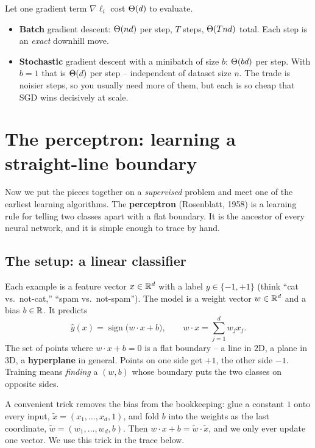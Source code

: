 \begin{complexitybox}
Let one gradient term $\nabla\ell_i$ cost $\Theta(d)$ to evaluate.
\begin{itemize}
  \item \textbf{Batch} gradient descent: $\Theta(nd)$ per step, $T$ steps,
        $\Theta(Tnd)$ total. Each step is an \emph{exact} downhill move.
  \item \textbf{Stochastic} gradient descent with a minibatch of size $b$:
        $\Theta(bd)$ per step. With $b=1$ that is $\Theta(d)$ per step -- independent
        of dataset size $n$. The trade is noisier steps, so you usually need
        more of them, but each is so cheap that SGD wins decisively at scale.
\end{itemize}
\end{complexitybox}

\section{The perceptron: learning a straight-line boundary}
\label{ch36:perceptron}

Now we put the pieces together on a \emph{supervised} problem and meet one of
the earliest learning algorithms. The \textbf{perceptron} (Rosenblatt, 1958) is
a learning rule for telling two classes apart with a flat boundary. It is the
ancestor of every neural network, and it is simple enough to trace by hand.

\subsection{The setup: a linear classifier}

Each example is a feature vector $x\in\mathbb{R}^d$ with a label $y\in\{-1,+1\}$ (think
``cat vs.\ not-cat,'' ``spam vs.\ not-spam''). The model is a weight vector
$w\in\mathbb{R}^d$ and a bias $b\in\mathbb{R}$. It predicts
\[
  \hat{y}(x) = \operatorname{sign}\big(w\cdot x + b\big),
  \qquad w\cdot x = \sum_{j=1}^{d} w_j x_j .
\]
The set of points where $w\cdot x + b = 0$ is a flat boundary -- a line in $2$D,
a plane in $3$D, a \textbf{hyperplane} in general. Points on one side get $+1$,
the other side $-1$. Training means \emph{finding} a $(w,b)$ whose boundary puts
the two classes on opposite sides.

\begin{focusbox}
A convenient trick removes the bias from the bookkeeping: glue a constant $1$
onto every input, $\tilde{x} = (x_1,\dots,x_d,1)$, and fold $b$ into the weights
as the last coordinate, $\tilde{w} = (w_1,\dots,w_d,b)$. Then
$w\cdot x + b = \tilde{w}\cdot\tilde{x}$, and we only ever update one vector.
We use this trick in the trace below.
\end{focusbox}

